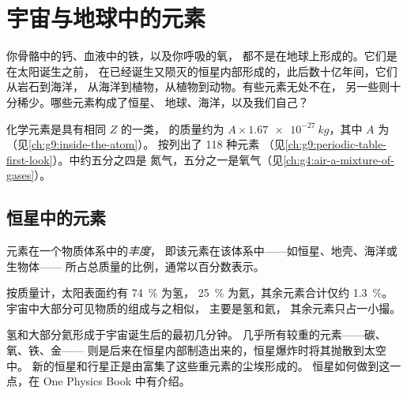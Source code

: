 \chapter{宇宙与地球中的元素}\label{ch:g9:elements-universe-earth}

你骨骼中的钙、血液中的铁，以及你呼吸的氧，
都不是在地球上形成的。它们是在太阳诞生之前，
在已经诞生又陨灭的恒星内部形成的，此后数十亿年间，它们从岩石到海洋，
从海洋到植物，从植物到动物。有些元素无处不在，
另一些则十分稀少。哪些元素构成了恒星、
地球、海洋，以及我们自己？

\begin{recall}
化学元素是具有相同 $Z$ 的一类，
的质量约为 $A \times \qty{1.67e-27}{kg}$，其中 $A$
为（见\cref{ch:g9:inside-the-atom}）。
按列出了 118 种元素
（见\cref{ch:g9:periodic-table-first-look}）。中约五分之四是
氮气，五分之一是氧气（见\cref{ch:g4:air-a-mixture-of-gases}）。
\end{recall}

\section{恒星中的元素}

\begin{definition}[丰度]\label{def:g9:elements-universe-earth:abundance}
元素在一个物质体系中的\emph{丰度}，
即该元素在该体系中——如恒星、地壳、海洋或生物体——
所占总质量的比例，通常以百分数表示。
\end{definition}

\begin{proposition}[太阳由氢和氦组成]\label{prop:g9:elements-universe-earth:sun}
按质量计，太阳表面约有 \qty{74}{\percent} 为氢，
\qty{25}{\percent} 为氦，其余元素合计仅约 \qty{1.3}{\percent}。
宇宙中大部分可见物质的组成与之相似，
主要是氢和氦，
其余元素只占一小撮。
\end{proposition}

\begin{proposition}[恒星中形成的元素]\label{prop:g9:elements-universe-earth:stars}
氢和大部分氦形成于宇宙诞生后的最初几分钟。
几乎所有较重的元素——碳、氧、铁、金——
则是后来在恒星内部制造出来的，恒星爆炸时将其抛散到太空中。
新的恒星和行星正是由富集了这些重元素的尘埃形成的。
恒星如何做到这一点，在 One Physics Book 中有介绍。
\end{proposition}

